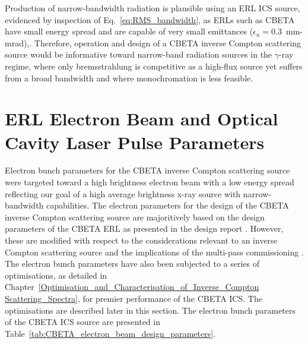 \documentclass[../main.tex]{subfiles}
\begin{document}
 Production of narrow-bandwidth radiation is plausible using an ERL ICS source, evidenced by inspection of Eq.~\ref{eq:RMS_bandwidth}, as ERLs such as CBETA have small energy spread and are capable of very small emittances ($\epsilon_{n} = 0.3$~\si{\milli\meter}-\si{\milli\radian}),. Therefore, operation and design of a CBETA inverse Compton scattering source would be informative toward narrow-band radiation sources in the $\gamma$-ray regime, where only bremsstrahlung is competitive as a high-flux source yet suffers from a broad bandwidth and where monochromation is less feasible. 

\section{ERL Electron Beam and Optical Cavity Laser Pulse Parameters}


Electron bunch parameters for the CBETA inverse Compton scattering source were targeted toward a high brightness electron beam with a low energy spread reflecting our goal of a high average brightness x-ray source with narrow-bandwidth capabilities. The electron parameters for the design of the CBETA inverse Compton scattering source are majoritively based on the design parameters of the CBETA ERL as presented in the design report \cite{hoffstaetter2017cbeta}. However, these are modified with respect to the considerations relevant to an inverse Compton scattering source and the implications of the multi-pass commissioning \cite{bartnik2020cbeta}. The electron bunch parameters have also been subjected to a series of optimisations, as detailed in Chapter~\ref{Optimisation_and_Characterisation_of_Inverse_Compton Scattering_Spectra}, for premier performance of the CBETA ICS. The optimisations are described later in this section. The electron bunch parameters of the CBETA ICS source are presented in Table~\ref{tab:CBETA_electron_beam_design_parameters}.  
\end{document}
